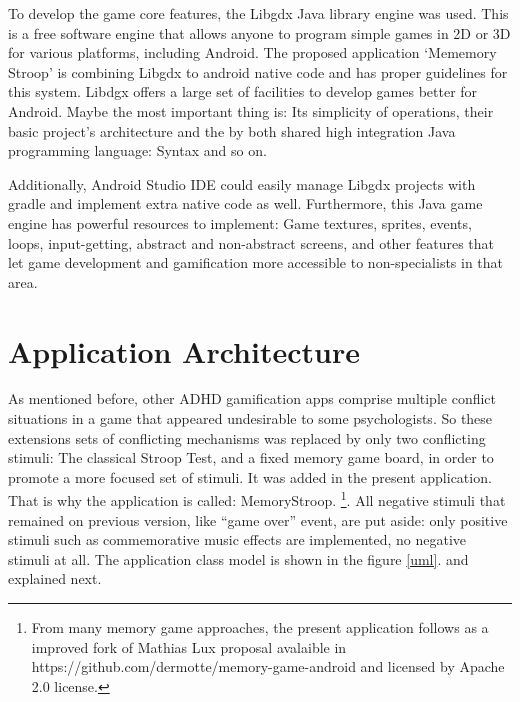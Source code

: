To develop the game core features, the Libgdx Java library engine was used. This is a free software engine that allows anyone to program simple games  in 2D or 3D for various platforms, including Android. The proposed application ‘Mememory Stroop’ is combining Libgdx to android native code and  has proper guidelines for this system. Libdgx offers a large set of facilities to develop games better for Android. Maybe the most important thing is: Its simplicity of operations, their basic project's architecture and the by both shared high integration Java programming language: Syntax and so on. 

Additionally, Android Studio IDE could easily manage Libgdx projects with gradle and implement extra native code as well. Furthermore, this Java game engine has powerful resources to implement: Game textures, sprites, events, loops, input-getting, abstract and non-abstract screens, and other features that let game development and gamification more accessible to non-specialists in that area.

		
\section{Application Architecture}

As mentioned before, other ADHD gamification apps comprise multiple conflict situations in a game that appeared undesirable to some psychologists. So these extensions sets of conflicting mechanisms was replaced by only two conflicting stimuli: The classical Stroop Test, and a fixed memory game board, in order to promote a more focused set of stimuli. It was added in the present application. That is why the application is called: MemoryStroop. \footnote{From many memory game approaches, the present application follows as a improved fork of Mathias Lux proposal avalaible in https://github.com/dermotte/memory-game-android and licensed by Apache 2.0 license.}.  All negative stimuli that remained on previous version, like ``game over'' event, are put aside: only positive stimuli such as commemorative music effects are implemented, no negative stimuli at all. The application class model is shown in the figure \ref{uml}. and explained next.
		
